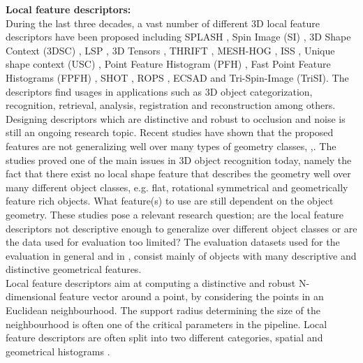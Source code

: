 \documentclass[10pt,twocolumn,letterpaper]{article}
\begin{document}
\noindent
\textbf{Local feature descriptors:}\\
During the last three decades, a vast number of different 3D local feature descriptors have been proposed including SPLASH \cite{Stein1992}, Spin Image (SI) \cite{Johnson1999}, 3D Shape Context (3DSC) \cite{Frome2004}, LSP \cite{ChenBhanu2004}, 3D Tensors \cite{Mian2006}, THRIFT \cite{Flint2007}, MESH-HOG \cite{Zaharescu2009}, ISS \cite{Zhong2009}, Unique shape context (USC) \cite{usc2010}, Point Feature Histogram (PFH) \cite{Rusu2008}, Fast Point Feature Histograms (FPFH) \cite{Fpfh2009}, SHOT \cite{Tombari2010}, ROPS \cite{Guo2013}, ECSAD \cite{Ecsad2015} and Tri-Spin-Image (TriSI)\cite{Guo2015}. The descriptors find usages in applications such as 3D object categorization, recognition, retrieval, analysis, registration and reconstruction among others. Designing descriptors which are distinctive and robust to occlusion and noise is still an ongoing research topic. Recent studies have shown that the proposed features are not generalizing well over many types of geometry classes, \cite{Guo2015},\cite{Buch2016}. The studies proved one of the main issues in 3D object recognition today, namely the fact that there exist no local shape feature that describes the geometry well over many different object classes, e.g. flat, rotational symmetrical and geometrically feature rich objects. What feature(s) to use are still dependent on the object geometry. These studies pose a relevant research question; are the local feature descriptors not descriptive enough to generalize over different object classes or are the data used for evaluation too limited? The evaluation datasets used for the evaluation in general and in \cite{Guo2015},\cite{Buch2016} consist mainly of objects with many descriptive and distinctive geometrical features.\\ 
Local feature descriptors aim at computing a distinctive and robust N-dimensional feature vector around a point, by considering the points in an Euclidean neighbourhood. The support radius determining the size of the neighbourhood is often one of the critical parameters in the pipeline. Local feature descriptors are often split into two different categories, spatial and geometrical histograms \cite{Salti2014}. %

\end{document}
